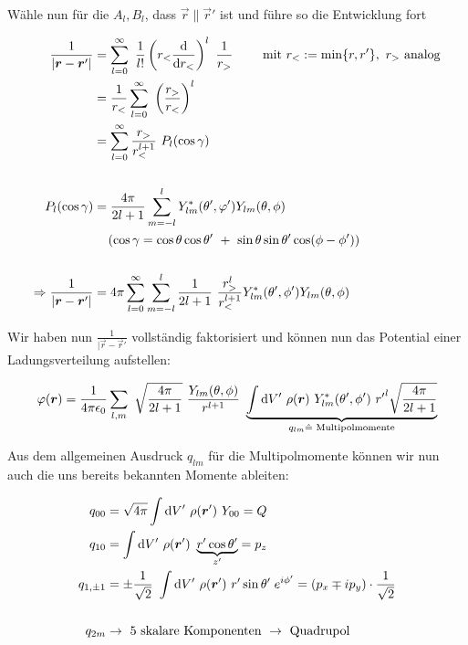Wähle nun für die $A_l, B_l$, dass $\vec{r}\parallel\vec{r}'$ ist und führe so die Entwicklung fort

\begin{align*}
\frac{1}{|\vec{r}-\vec{r}'|} &= \sum_{l=0}^{\infty} \ \frac{1}{l!} \left(\-r_{<}\diff{}{r_{<}}\right)^l \ \frac{1}{r_{>}} \qquad \text{ mit } r_{<} := \min\{r,r'\}, \ r_{>} \text{ analog}\\
&= \frac{1}{r_{<}}\sum_{l=0}^{\infty} \ \left(\frac{r_{>}}{r_{<}}\right)^l\\
&=  \sum_{l=0}^{\infty} \frac{r_{>}}{r_{<}^{l+1}} \ P_l (\cos\gamma)\\
\\
P_l (\cos\gamma) &= \frac{4\pi}{2l+1}\sum_{m=-l}^{l}  Y^{*}_{lm}(\theta',\varphi')Y_{lm}(\theta,\phi)\\
& \quad\left(\cos\gamma = \cos\theta\cos\theta' \ + \ \sin\theta\sin\theta'\cos(\phi-\phi')\right)\\
\\
\Rightarrow \frac{1}{|\vec{r}-\vec{r}'|} &= 4\pi \sum_{l=0}^{\infty}\sum_{m=-l}^{l} \frac{1}{2l+1}\ \frac{r_{>}^l}{r_{<}^{l+1}} Y^{*}_{lm}(\theta',\phi')Y_{lm}(\theta,\phi)
\end{align*}

Wir haben nun $\frac{1}{|\vec{r}-\vec{r}'}$ vollständig faktorisiert und können nun das Potential einer Ladungsverteilung aufstellen:

\begin{equation*}
\varphi (\vec{r}) = \frac{1}{4\pi\epsilon_0} \sum_{l,m} \ \sqrt{\frac{4\pi}{2l +1}} \ \frac{Y_{lm}(\theta,\phi)}{r^{l+1}} \ \underbrace{\int\d V' \  \rho(\vec{r}) \  Y_{lm}^{*}(\theta',\phi') \ {r'}^l \sqrt{\frac{4\pi}{2l+1}}}_{q_{lm} \hat{=} \text{ Multipolmomente}}
\end{equation*}

Aus dem allgemeinen Ausdruck $q_{lm}$ für die Multipolmomente können wir nun auch die uns bereits bekannten Momente ableiten:

\begin{align*}
q_{00} &= \sqrt{4\pi}\int\d V' \ \rho(\vec{r}') \ Y_{00} = Q
\\
q_{10} &= \int\d V' \ \rho(\vec{r}') \ \underbrace{r'\cos\theta'}_{z'} = p_z\\
q_{1,\pm 1} &= \pm \frac{1}{\sqrt{2}} \ \int\d V' \ \rho(\vec{r}')  \ r'\sin\theta' \; e^{i\phi'} = (p_x \mp i p_y) \cdot \frac{1}{\sqrt{2}}\\
\\q_{2m} &\rightarrow \text{ 5 skalare Komponenten } \rightarrow \text{ Quadrupol}
\end{align*}